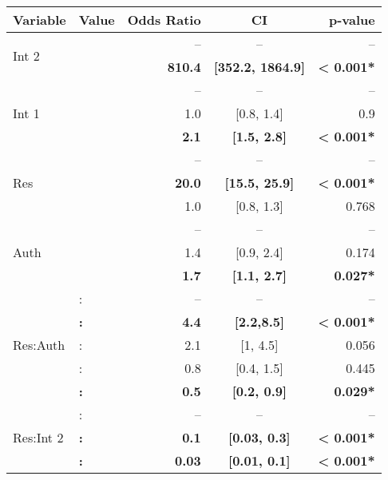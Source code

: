 \begin{table}[t]
\small
\centering
\begin{threeparttable}
\small
\begin{tabular}{l l r c r}
    \textbf{Variable} & \textbf{Value} & \textbf{Odds Ratio} & \textbf{CI} & \textbf{$\boldsymbol{p}$-value} \\
    \toprule \toprule
     \multirow{2}{*}{Int 2} & \backgroundonly{} & -- & -- & -- \\     
     						& \textbf{\interactive{}} & \textbf{810.4} & \textbf{[352.2, 1864.9]} & \textbf{< 0.001*} \\
     \midrule
      \multirow{3}{*}{Int 1} & \backgroundonly{} & -- & -- & -- \\
      					    & \interactive{} & 1.0 & [0.8, 1.4] & 0.9\\
					    & \textbf{\backgroundnotify{}} & \textbf{2.1} & \textbf{[1.5, 2.8]} & \textbf{< 0.001*}\\
     \midrule
     \multirow{3}{*}{Res} & \mic{} & -- & -- & -- \\
     					& \textbf{\location{}} & \textbf{20.0} & \textbf{[15.5, 25.9]} & \textbf{< 0.001*} \\
     					    & \contacts{} &  1.0 & [0.8, 1.3] & 0.768 \\
     \midrule
     \multirow{3}{*}{Auth} & \never{} & -- & -- & -- \\
     					& \first{} & 1.4 & [0.9, 2.4] & 0.174 \\
					          & \textbf{\launch{}} & \textbf{1.7} & \textbf{[1.1, 2.7]} & \textbf{0.027*} \\
     \midrule \midrule
     \multirow{5}{*}{Res:Auth} & \mic{}:\never{} & -- & -- & -- \\
     						 & \textbf{\contacts{}:\launch{}} & \textbf{4.4} & \textbf{[2.2,8.5]} & \textbf{< 0.001*}\\
     						   & \contacts{}:\first{} & 2.1 & [1, 4.5] & 0.056\\
						   & \location{}:\launch{} & 0.8 & [0.4, 1.5] & 0.445\\
						   & \textbf{\location{}:\first{}} & \textbf{0.5} & \textbf{[0.2, 0.9]} & \textbf{0.029*}\\
     \midrule
     \multirow{3}{*}{Res:Int 2} & \mic{}:\backgroundonly{} & -- & -- & -- \\							
     							& \textbf{\location{}:\interactive{}} & \textbf{0.1} & \textbf{[0.03, 0.3]} & \textbf{< 0.001*}\\	
     							   & \textbf{\contacts{}:\interactive{}} & \textbf{0.03} & \textbf{[0.01, 0.1]} & \textbf{< 0.001*}\\

\end{tabular}
\end{threeparttable}
\end{table}
